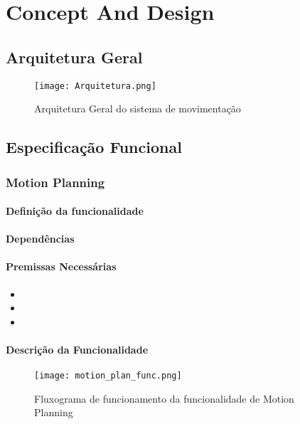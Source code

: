\chapter{Concept And Design}\label{cap:CnptDsng}

\section{Arquitetura Geral}\label{sec:arqgrl}
\lipsum[5]
\begin{figure}[h]
	\centering
	\texttt{[image: Arquitetura.png]}
	\caption{Arquitetura Geral do sistema de movimentação}
	\label{fig:arq_geral}
\end{figure} 
\lipsum[5]


\section{Especificação Funcional}
\lipsum[3]

\subsection{Motion Planning}
\subsubsection{Definição da funcionalidade}
\lipsum[3]
\subsubsection{Dependências}
\lipsum[5]

\subsubsection{Premissas Necessárias}
\lipsum[1]
\begin{itemize}
	\item \lipsum[1]
	\item \lipsum[1]
	\item \lipsum[1]
\end{itemize}
\subsubsection{Descrição da Funcionalidade}
\lipsum[5]

\begin{figure}[h]
	\centering
	\texttt{[image: motion\_plan\_func.png]}
	\caption{Fluxograma de funcionamento da funcionalidade de Motion Planning}
	\label{fig:flux_motion}
\end{figure}

